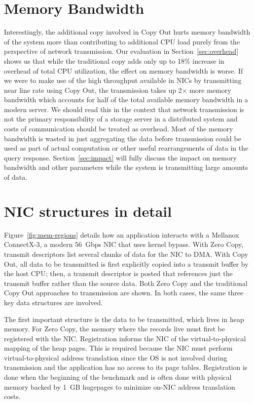 \section{Memory Bandwidth}
Interestingly, the additional copy involved in Copy Out hurts memory bandwidth of the system more than contributing 
to additional CPU load purely from the perspective of network transmission. Our evaluation in Section~\ref{sec:overhead} shows us that while the traditional
copy adds only up to 18\% increase in overhead of total CPU utilization, the effect on memory bandwidth is worse.
 If we were to make use of the high throughput available in NICs by transmitting near line rate using Copy Out, 
 the transmission takes up 2$\times$ more memory bandwidth which accounts for half of the total available memory bandwidth in a modern server.
  We should read this in the context that network transmission is not the primary responsibility of a storage server in a distributed system
   and costs of communication should be treated as overhead. Most of the memory bandwidth is wasted in just aggregating the data 
before transmission could be used as part of actual computation or other useful rearrangements of data in 
the query response. Section~\ref{sec:impact} will fully discuss the impact on memory bandwidth and other parameters while the system 
is transmitting large amounts of data.


\section{NIC structures in detail}
Figure~\ref{fig:mem-regions} details how an application interacts with a Mellanox
ConnectX-3\textregistered , a modern 56~Gbps NIC that uses kernel bypass. 
With Zero Copy, transmit descriptors list several chunks of data for
the NIC to DMA. With Copy Out, all data to be transmitted is first explicitly
copied into a transmit buffer by the host CPU; then, a transmit descriptor is
posted that references just the transmit buffer rather than the 
source data. Both Zero Copy and the traditional Copy Out approaches to transmission are shown.
In both cases, the same three key data structures are involved. 

The first important structure is the
data to be transmitted, which lives in heap memory. For Zero Copy, the memory
where the records live must first be registered with the NIC. Registration
informs the NIC of the virtual-to-physical mapping of the heap pages. This is
required because the NIC must perform virtual-to-physical address translation
since the OS is not involved during transmission and the application has no
access to its page tables. Registration is done when the beginning of the benchmark and is often
done with physical memory backed by 1~GB hugepages to minimize on-NIC address
translation costs.



